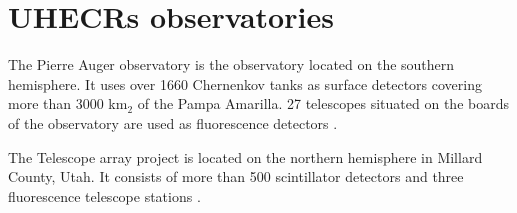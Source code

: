 \section{UHECRs observatories}
The Pierre Auger observatory is the observatory located on the southern hemisphere. It uses over 1660 Chernenkov tanks as surface detectors covering more than 3000 k$\textrm{m}_2$ of the Pampa Amarilla. 27 telescopes situated on the boards of the observatory are used as fluorescence detectors \cite{Tomankova2016_1000061954}.
\par
The Telescope array project is located on the northern hemisphere in Millard County, Utah. It consists of more than 500 scintillator detectors and  three fluorescence telescope stations \cite{Array}.


